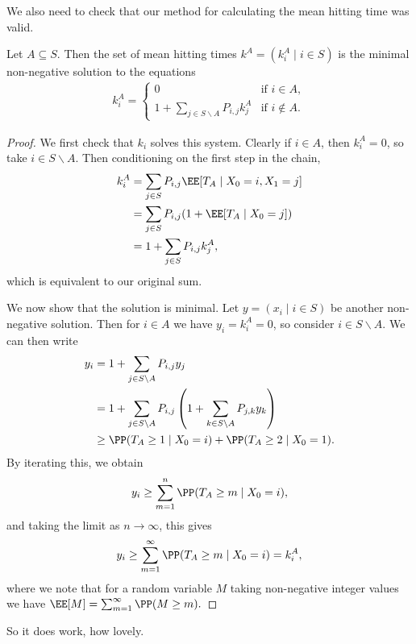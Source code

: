 \documentclass[a4paper]{scrartcl}
\begin{document}
We also need to check that our method for calculating the mean hitting time was valid.

\begin{theorem}
	Let $A \subseteq S$. Then the set of mean hitting times $k^A = (k_i^A \mid i \in S)$ is the minimal non-negative solution to the equations
	\begin{align*}
		k_i^A = \begin{cases}
			0 &\mbox{if } i  \in A, \\
			1 + \sum_{j \in S\backslash A} P_{i, j} k_j^A &\mbox{if } i \not \in A.
		   \end{cases}
	\end{align*}
\end{theorem}
\begin{proof}
	We first check that $k_i$ solves this system. Clearly if $i \in A$, then $k_i^A = 0$, so take $i \in S \backslash A$. Then conditioning on the first step in the chain,
	\begin{align*}
		k_i^A &= \sum_{j \in S} P_{i, j}\EE[T_A \mid X_0 = i, X_1 = j]  \\
		&= \sum_{j \in S} P_{i, j}(1 + \EE[T_A \mid X_0 = j]) \\
		&= 1 + \sum_{j \in S} P_{i, j} k_j^A, 	
	\end{align*}
	which is equivalent to our original sum.

	We now show that the solution is minimal. Let $y = (x_i \mid i \in S)$ be another non-negative solution. Then for $i \in A$ we have $y_i = k_i^A = 0$, so consider $i \in S \backslash A$. We can then write
	\begin{align*}
	y_i &= 1 + \sum_{j \in S \backslash A} P_{i, j} y_j  \\
	&= 1 + \sum_{j \in S \backslash A} P_{i, j}\left(1 + \sum_{k \in S \backslash A} P_{j, k} y_k\right) \\
	&\geq \PP(T_A \geq 1 \mid X_0 = i) + \PP(T_A \geq 2 \mid X_0 = 1).
	\end{align*}
	By iterating this, we obtain
	$$
	y_i \geq \sum_{m = 1}^n \PP(T_A \geq m \mid X_0 = i),
	$$
	and taking the limit as $n \rightarrow \infty$, this gives
	$$
	y_i \geq \sum_{m = 1}^{\infty} \PP(T_A \geq m \mid X_0 = i) = k_i^A,
	$$
	where we note that for a random variable $M$ taking non-negative integer values we have $\EE[M] = \sum_{m = 1}^{\infty} \PP(M \geq m).$
\end{proof}

So it does work, how lovely.
\end{document}
